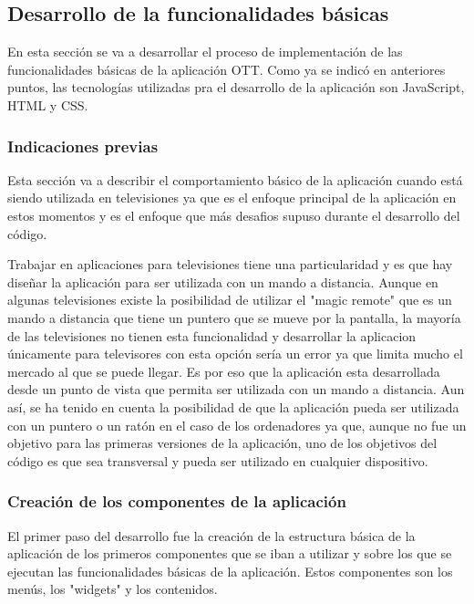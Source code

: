 \subsection{Desarrollo de la funcionalidades básicas}
\label{sec:desarrollo_funcionalidades_basicas}

En esta sección se va a desarrollar el proceso de implementación de las funcionalidades básicas de la aplicación OTT.
Como ya se indicó en anteriores puntos, las tecnologías utilizadas pra el desarrollo de la aplicación son JavaScript, HTML y CSS.

\subsubsection{Indicaciones previas}
\label{sec:indicaciones_previas}

Esta sección va a describir el comportamiento básico de la aplicación cuando está siendo utilizada en televisiones ya que
es el enfoque principal de la aplicación en estos momentos y es el enfoque que más desafios supuso durante el desarrollo del código.

Trabajar en aplicaciones para televisiones tiene una particularidad y es que hay diseñar la aplicación para ser utilizada
con un mando a distancia. Aunque en algunas televisiones existe la posibilidad de utilizar el "magic remote" que es un mando
a distancia que tiene un puntero que se mueve por la pantalla, la mayoría de las televisiones no tienen esta funcionalidad y
desarrollar la aplicacion únicamente para televisores con esta opción sería un error ya que limita mucho el mercado al que
se puede llegar. Es por eso que la aplicación esta desarrollada desde un punto de vista que permita ser utilizada con un mando
a distancia. Aun así, se ha tenido en cuenta la posibilidad de que la aplicación pueda ser utilizada con un puntero o un ratón
en el caso de los ordenadores ya que, aunque no fue un objetivo para las primeras versiones de la aplicación, uno de los objetivos del 
código es que sea transversal y pueda ser utilizado en cualquier dispositivo. 

\subsubsection{Creación de los componentes de la aplicación}
\label{sec:creacion_componentes_aplicacion}

El primer paso del desarrollo fue la creación de la estructura básica de la aplicación de los primeros componentes que se iban a utilizar y 
sobre los que se ejecutan las funcionalidades básicas de la aplicación. Estos componentes son los menús, los "widgets" y los contenidos.

